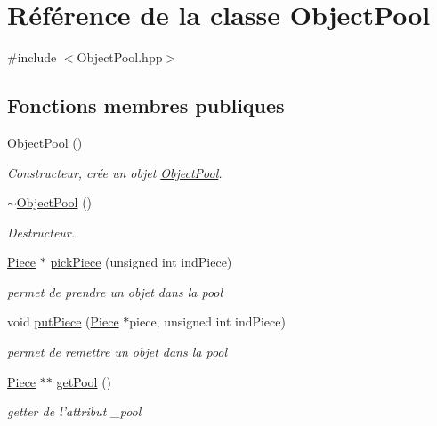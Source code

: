 \hypertarget{class_object_pool}{\section{Référence de la classe Object\-Pool}
\label{class_object_pool}
}


{\ttfamily \#include $<$Object\-Pool.\-hpp$>$}

\subsection*{Fonctions membres publiques}
\begin{DoxyCompactItemize}
\item 
\hyperlink{class_object_pool_ad6a851944917327bd1c035f9a81e0684}{Object\-Pool} ()
\begin{DoxyCompactList}\small\item\em Constructeur, crée un objet \hyperlink{class_object_pool}{Object\-Pool}. \end{DoxyCompactList}\item 
\hyperlink{class_object_pool_ae45acbed251b192f83bc68ef277a7a3f}{$\sim$\-Object\-Pool} ()
\begin{DoxyCompactList}\small\item\em Destructeur. \end{DoxyCompactList}\item 
\hyperlink{class_piece}{Piece} $\ast$ \hyperlink{class_object_pool_aa6b45de56e448971193590ec18269ca0}{pick\-Piece} (unsigned int ind\-Piece)
\begin{DoxyCompactList}\small\item\em permet de prendre un objet dans la pool \end{DoxyCompactList}\item 
void \hyperlink{class_object_pool_a6f4c72edf13fadf5d873be5ef6f27cd5}{put\-Piece} (\hyperlink{class_piece}{Piece} $\ast$piece, unsigned int ind\-Piece)
\begin{DoxyCompactList}\small\item\em permet de remettre un objet dans la pool \end{DoxyCompactList}\item 
\hyperlink{class_piece}{Piece} $\ast$$\ast$ \hyperlink{class_object_pool_af9f18a929a7de70525a18bf1622bb68c}{get\-Pool} ()
\begin{DoxyCompactList}\small\item\em getter de l'attribut \-\_\-pool \end{DoxyCompactList}\end{DoxyCompactItemize}


